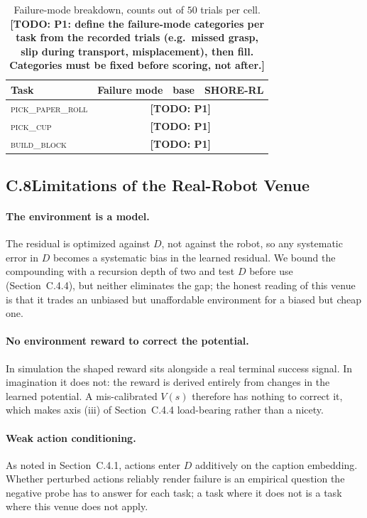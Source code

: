 \documentclass[letterpaper]{article} %
\newcommand{\todo}[1]{\textbf{[TODO: #1]}}
\begin{document}
\begin{table}[t]
\centering\small\setlength{\tabcolsep}{4pt}
\begin{tabular}{@{}llcc@{}}
\toprule
Task & Failure mode & base & \textbf{SHORE-RL} \\
\midrule
\textsc{pick\_paper\_roll} & \multicolumn{3}{c}{\todo{P1}} \\
\textsc{pick\_cup}         & \multicolumn{3}{c}{\todo{P1}} \\
\textsc{build\_block}      & \multicolumn{3}{c}{\todo{P1}} \\
\bottomrule
\end{tabular}
\caption{Failure-mode breakdown, counts out of $50$ trials per cell.
\todo{P1: define the failure-mode categories per task from the recorded trials
(e.g.\ missed grasp, slip during transport, misplacement), then fill. Categories
must be fixed before scoring, not after.}}
\label{tab:failmodes}
\end{table}

\subsection{C.8\quad Limitations of the Real-Robot Venue}

\paragraph{The environment is a model.}
The residual is optimized against $D$, not against the robot, so any systematic
error in $D$ becomes a systematic bias in the learned residual. We bound the
compounding with a recursion depth of two and test $D$ before use
(Section~C.4.4), but neither eliminates the gap; the honest reading of this venue
is that it trades an unbiased but unaffordable environment for a biased but
cheap one.

\paragraph{No environment reward to correct the potential.}
In simulation the shaped reward sits alongside a real terminal success signal. In
imagination it does not: the reward is derived entirely from changes in the learned
potential. A
mis-calibrated $V(s)$ therefore has nothing to correct it, which makes axis
(iii) of Section~C.4.4 load-bearing rather than a nicety.

\paragraph{Weak action conditioning.}
As noted in Section~C.4.1, actions enter $D$ additively on the caption embedding.
Whether perturbed actions reliably render failure is an empirical question the
negative probe has to answer for each task; a task where it does not is a task
where this venue does not apply.
\end{document}
